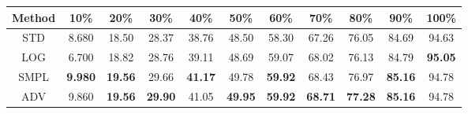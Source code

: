 \documentclass{standalone}
\begin{document}
\begin{tabular}{c|cccccccccc}
      \toprule
      Method & 10\% & 20\% & 30\% & 40\% & 50\% & 60\% & 70\% & 80\% & 90\% & 100\% \\
      \midrule
STD & 8.680 & 18.50 & 28.37 & 38.76 & 48.50 & 58.30 & 67.26 & 76.05 & 84.69 & 94.63\\
LOG & 6.700 & 18.82 & 28.76 & 39.11 & 48.69 & 59.07 & 68.02 & 76.13 & 84.79 & \textbf{95.05}\\
SMPL & \textbf{9.980} & \textbf{19.56} & 29.66 & \textbf{41.17} & 49.78 & \textbf{59.92} & 68.43 & 76.97 & \textbf{85.16} & 94.78\\
ADV & 9.860 & \textbf{19.56} & \textbf{29.90} & 41.05 & \textbf{49.95} & \textbf{59.92} & \textbf{68.71} & \textbf{77.28} & \textbf{85.16} & 94.78\\
  \bottomrule
\end{tabular}
\end{document}
